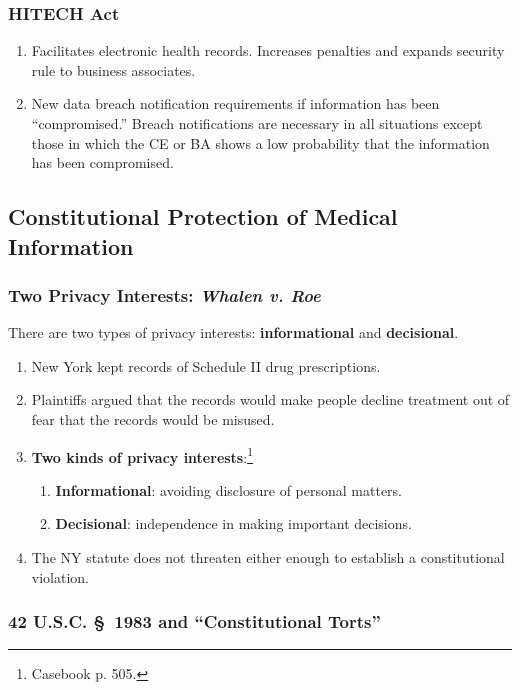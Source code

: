 \subsubsection{HITECH Act}

\begin{enumerate}
    \item Facilitates electronic health records. Increases penalties and expands 
    security rule to business associates.
    \item New data breach notification requirements if information has been 
    ``compromised.'' Breach notifications are necessary in all situations except 
    those in which the CE or BA shows a low probability that the information has 
    been compromised.
\end{enumerate}

\subsection{Constitutional Protection of Medical Information}

\subsubsection{Two Privacy Interests: \emph{Whalen v. Roe}}

There are two types of privacy interests: \textbf{informational} and 
\textbf{decisional}.

\begin{enumerate}
    \item New York kept records of Schedule II drug prescriptions.
    \item Plaintiffs argued that the records would make people decline treatment 
    out of fear that the records would be misused.
    \item \textbf{Two kinds of privacy interests}:\footnote{Casebook p. 505.}
    \begin{enumerate}
        \item \textbf{Informational}: avoiding disclosure of personal matters.
        \item \textbf{Decisional}: independence in making important decisions.
    \end{enumerate}
    \item The NY statute does not threaten either enough to establish a 
    constitutional violation.
\end{enumerate}

\subsubsection{42 U.S.C. \S\ 1983 and ``Constitutional Torts''}

